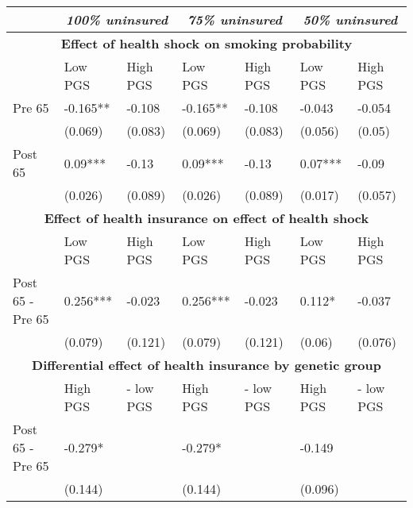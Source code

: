 % 
\begin{tabular}{ l | p{2cm}p{2cm}| p{2cm}p{2cm}| p{2cm}p{2cm}}
  & \multicolumn{2}{c}{ \textit{100\% uninsured}} & \multicolumn{2}{c}{ \textit{75\% uninsured}} & \multicolumn{2}{c}{ \textit{50\% uninsured}} \\
 \toprule
  \multicolumn{7}{c}{ \textbf{Effect of health shock on smoking probability}} \\
 \midrule
 & Low PGS & High PGS & Low PGS & High PGS & Low PGS & High PGS \\ 
   \midrule
Pre 65 & -0.165** & -0.108 & -0.165** & -0.108 & -0.043 & -0.054 \\ 
   & (0.069) & (0.083) & (0.069) & (0.083) & (0.056) & (0.05) \\ 
  Post 65 & 0.09*** & -0.13 & 0.09*** & -0.13 & 0.07*** & -0.09 \\ 
   & (0.026) & (0.089) & (0.026) & (0.089) & (0.017) & (0.057) \\ 
   \toprule \multicolumn{7}{c}{ \textbf{Effect of health insurance on effect of health shock}} \\
 \midrule
 & Low PGS & High PGS & Low PGS & High PGS & Low PGS & High PGS \\ 
   \midrule
Post 65 - Pre 65 & 0.256*** & -0.023 & 0.256*** & -0.023 & 0.112* & -0.037 \\ 
   & (0.079) & (0.121) & (0.079) & (0.121) & (0.06) & (0.076) \\ 
   \toprule \multicolumn{7}{c}{ \textbf{Differential effect of health insurance by genetic group}} \\
 \midrule
 & High PGS  & - low PGS & High PGS  & - low PGS & High PGS  & - low PGS \\ 
   \midrule
Post 65 - Pre 65 & -0.279* &  & -0.279* &  & -0.149 &  \\ 
   & (0.144) &  & (0.144) &  & (0.096) &  \\ 
  \end{tabular}
